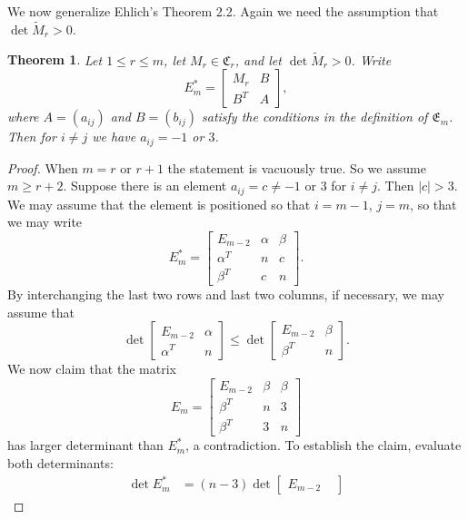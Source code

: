 \documentclass[11pt,a4paper]{article}
\newtheorem{theorem}{Theorem}
\begin{document}
We now generalize Ehlich's Theorem 2.2.  Again we need the assumption that
$\det\tilde M_r>0$.

\begin{theorem}\label{theo:minusOneAndThree}
Let $1\le r\le m$, let $M_r\in\mathfrak{C}_r$, and let $\det\tilde M_r>0$. 
Write
\begin{equation*}
E_m^*=\begin{bmatrix}M_r & B\\B^T & A\end{bmatrix},
\end{equation*}
where $A=(a_{ij})$ and $B=(b_{ij})$ satisfy the conditions in the definition
of $\mathfrak{E}_m$.  Then for $i\ne j$ we have $a_{ij}=-1$ or $3$.
\end{theorem}
\begin{proof}
When $m=r$ or $r+1$ the statement is vacuously true.  So we assume $m\ge r+2$.  Suppose there is an element $a_{ij}=c\ne-1$ or $3$ for $i\ne j$.  Then $|c|>3$.  We may assume that the element is positioned so that $i=m-1$, $j=m$, so that we may write
\begin{equation*}
E_m^*=\begin{bmatrix}E_{m-2} & \alpha & \beta\\\alpha^T & n & c\\\beta^T & c
& n\end{bmatrix}.
\end{equation*}
By interchanging the last two rows and last two columns, if necessary, we
may assume that
\begin{equation*}
\det\begin{bmatrix}E_{m-2} & \alpha\\\alpha^T & 
n\end{bmatrix}\le\det\begin{bmatrix}E_{m-2} & 
\beta\\\beta^T & n\end{bmatrix}.
\end{equation*}
We now claim that the matrix
\begin{equation*}
E_m=\begin{bmatrix}E_{m-2} & \beta & \beta\\\beta^T & n & 3\\\beta^T & 3 &
n\end{bmatrix}
\end{equation*}
has larger determinant than $E_m^*$, a contradiction.  To establish the
claim, evaluate both determinants:
\begin{align*}
\det E_m^*&= (n-3)\det\begin{bmatrix}E_{m-2} & 

\end{bmatrix}
\end{align*}
\end{proof}
\end{document}
